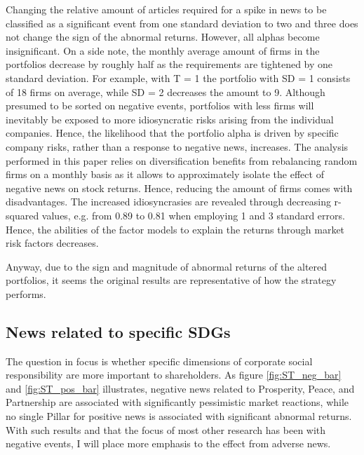 Changing the relative amount of articles required for a spike in news to be classified as a significant event from one standard deviation to two and three does not change the sign of the abnormal returns. However, all alphas become insignificant. On a side note, the monthly average amount of firms in the portfolios decrease by roughly half as the requirements are tightened by one standard deviation. For example, with T = 1 the portfolio with SD = 1 consists of 18 firms on average, while SD = 2 decreases the amount to 9. Although presumed to be sorted on negative events, portfolios with less firms will inevitably be exposed to more idiosyncratic risks arising from the individual companies. Hence, the likelihood that the portfolio alpha is driven by specific company risks, rather than a response to negative news, increases. The analysis performed in this paper relies on diversification benefits from rebalancing random firms on a monthly basis as it allows to approximately isolate the effect of negative news on stock returns. Hence, reducing the amount of firms comes with disadvantages. The increased idiosyncrasies are revealed through decreasing r-squared values, e.g. from 0.89 to 0.81 when employing 1 and 3 standard errors. Hence, the abilities of the factor models to explain the returns through market risk factors decreases. 

Anyway, due to the sign and magnitude of abnormal returns of the altered portfolios, it seems the original results are representative of how the strategy performs. 


\subsection{News related to specific SDGs}

The question in focus is whether specific dimensions of corporate social responsibility are more important to shareholders. As figure \ref{fig:ST_neg_bar} and \ref{fig:ST_pos_bar} illustrates, negative news related to Prosperity, Peace, and Partnership are associated with significantly pessimistic market reactions, while no single Pillar for positive news is associated with significant abnormal returns. With such results and that the focus of most other research has been with negative events, I will place more emphasis to the effect from adverse news.

